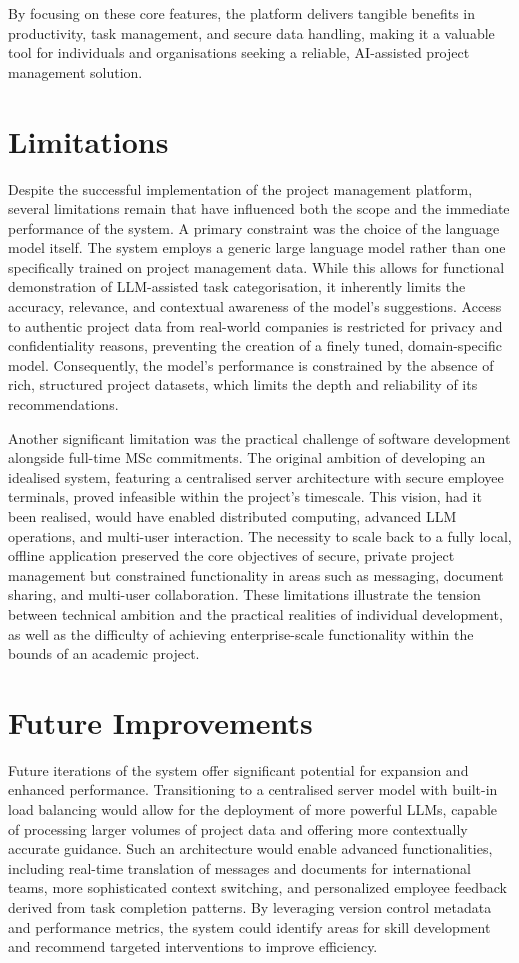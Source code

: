 \documentclass{report}
\begin{document}
By focusing on these core features, the platform delivers tangible benefits in productivity, task management, and secure data handling, making it a valuable tool for individuals and organisations seeking a reliable, AI-assisted project management solution.
\section{Limitations}
Despite the successful implementation of the project management platform, several limitations remain that have influenced both the scope and the immediate performance of the system. A primary constraint was the choice of the language model itself. The system employs a generic large language model rather than one specifically trained on project management data. While this allows for functional demonstration of LLM-assisted task categorisation, it inherently limits the accuracy, relevance, and contextual awareness of the model's suggestions. Access to authentic project data from real-world companies is restricted for privacy and confidentiality reasons, preventing the creation of a finely tuned, domain-specific model. Consequently, the model's performance is constrained by the absence of rich, structured project datasets, which limits the depth and reliability of its recommendations.

Another significant limitation was the practical challenge of software development alongside full-time MSc commitments. The original ambition of developing an idealised system, featuring a centralised server architecture with secure employee terminals, proved infeasible within the project's timescale. This vision, had it been realised, would have enabled distributed computing, advanced LLM operations, and multi-user interaction. The necessity to scale back to a fully local, offline application preserved the core objectives of secure, private project management but constrained functionality in areas such as messaging, document sharing, and multi-user collaboration. These limitations illustrate the tension between technical ambition and the practical realities of individual development, as well as the difficulty of achieving enterprise-scale functionality within the bounds of an academic project.
\section{Future Improvements}
Future iterations of the system offer significant potential for expansion and enhanced performance. Transitioning to a centralised server model with built-in load balancing would allow for the deployment of more powerful LLMs, capable of processing larger volumes of project data and offering more contextually accurate guidance. Such an architecture would enable advanced functionalities, including real-time translation of messages and documents for international teams, more sophisticated context switching, and personalized employee feedback derived from task completion patterns. By leveraging version control metadata and performance metrics, the system could identify areas for skill development and recommend targeted interventions to improve efficiency.
\end{document}
